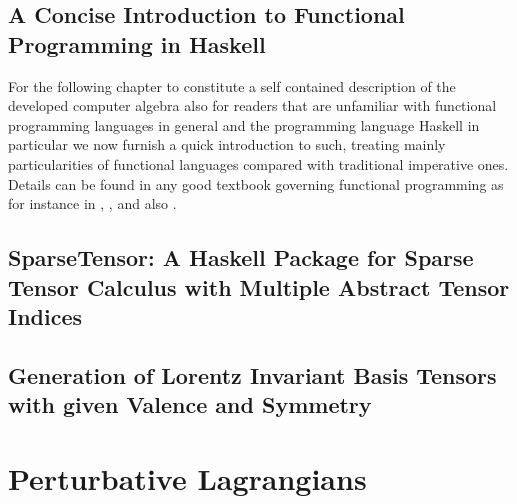 \documentclass[a4paper,12pt, DIV=14, BCOR=5mm, twoside, headsepline]{scrbook}
\begin{document}
\section{A Concise Introduction to Functional Programming in Haskell}
For the following chapter to constitute a self contained description of the developed computer algebra also for readers that are unfamiliar with functional programming languages in general and the programming language Haskell in particular we now furnish a quick introduction to such, treating mainly particularities of  functional languages compared with traditional imperative ones.
Details can be found in any good textbook governing functional programming as for instance in \cite{Thompson99thecraft}, \cite{bird_2014}, \cite{hutton_2007} and also \cite{OSullivan2008}.
\section{SparseTensor: A Haskell Package for Sparse Tensor Calculus with Multiple Abstract Tensor Indices }
\section{Generation of Lorentz Invariant Basis Tensors with given Valence and Symmetry}\label{LorentzGen}

\chapter{Perturbative Lagrangians}
\end{document}
